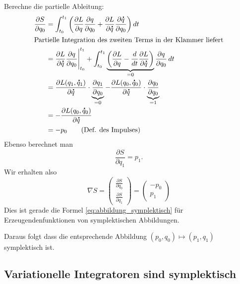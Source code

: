 Berechne die partielle Ableitung:
\begin{align*}
\frac{\partial S}{\partial q_0}
& =
\int_{t_0}^{t_1} \bigg( \frac{\partial L}{\partial q} \frac{\partial q}{\partial q_0} + \frac{\partial L}{\partial \dot q}\frac{\partial\dot q}{\partial q_0}\bigg)\,dt \\
%
\intertext{Partielle Integration des zweiten Terms in der Klammer liefert}
&=
\frac{\partial L}{\partial \dot q}\frac{\partial q}{\partial q_0}\Bigg\vert_{t_0}^{t_1} + \int_{t_0}^{t_1} \underbrace{\bigg( \frac{\partial L}{\partial q}  - \frac{d}{dt} \frac{\partial L}{\partial \dot q}\bigg)}_{=0} \frac{\partial q}{\partial q_0}\,dt \\
&= \frac{\partial L(q_1,\dot q_1)}{\partial \dot q} \cdot \underbrace{\frac{\partial q_1}{\partial q_0}}_{=0}  - \frac{\partial L(q_0,\dot q_0)}{\partial \dot q} \cdot \underbrace{\frac{\partial q_0}{\partial q_0}}_{=1}  \\
&= - \frac{\partial L(q_0,\dot q_0)}{\partial \dot q} \\
&= -p_0 \tag{Def. des Impulses}
\end{align*}
Ebenso berechnet man
\begin{equation*}
\frac{\partial S}{\partial q_1} = p_1.
\end{equation*}
Wir erhalten also
\begin{equation}
\nabla S =
\begin{pmatrix}
\frac{\partial S}{\partial q_0}  \\
\frac{\partial S}{\partial q_1}
\end{pmatrix}
=
\begin{pmatrix}
-p_0 \\ p_1
\end{pmatrix}
\end{equation}
Dies ist gerade die Formel \eqref{eq:abbildung_symplektisch} für Erzeugendenfunktionen von symplektischen Abbildungen.

Daraus folgt dass die entsprechende Abbildung $(p_0,q_0) \mapsto (p_1,q_1)$ symplektisch ist.












\subsection{Variationelle Integratoren sind symplektisch}


